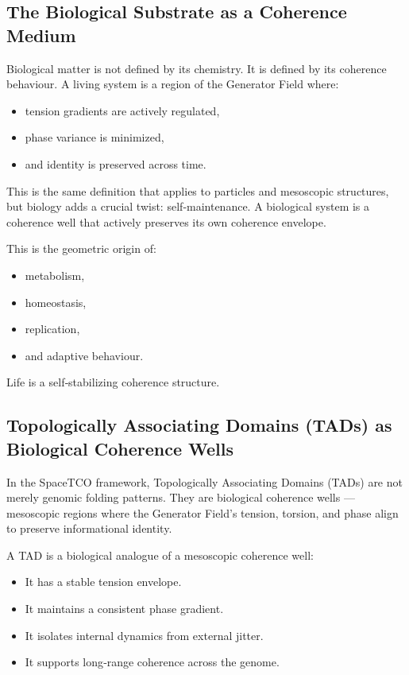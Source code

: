 \documentclass[reprint,amsmath,amssymb,aps,prl,floatfix]{revtex4-2}
\begin{document}
\begin{itemize}
\subsection{The Biological Substrate as a Coherence Medium}

Biological matter is not defined by its chemistry. It is defined by its coherence behaviour. A living system is a region of the Generator Field where:
\begin{itemize}
\item tension gradients are actively regulated,  
\item phase variance is minimized,  
\item and identity is preserved across time.
\end{itemize}

This is the same definition that applies to particles and mesoscopic structures, but biology adds a crucial twist: self‑maintenance. A biological system is a coherence well that actively preserves its own coherence envelope.
\medskip

This is the geometric origin of:

\begin{itemize}
\item metabolism,  
\item homeostasis,  
\item replication,  
\item and adaptive behaviour.
\end{itemize}

Life is a self‑stabilizing coherence structure.

\subsection{Topologically Associating Domains (TADs) as Biological Coherence Wells}

In the SpaceTCO framework, Topologically Associating Domains (TADs) are not merely genomic folding patterns. They are biological coherence wells — mesoscopic regions where the Generator Field’s tension, torsion, and phase align to preserve informational identity.
\medskip

A TAD is a biological analogue of a mesoscopic coherence well:

\begin{itemize}
\item It has a stable tension envelope.  
\item It maintains a consistent phase gradient.  
\item It isolates internal dynamics from external jitter.  
\item It supports long‑range coherence across the genome.
\end{itemize}
\medskip


\end{itemize}
\end{document}
